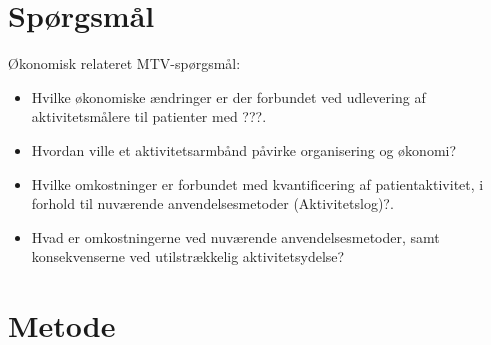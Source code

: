\documentclass[11pt,a4paper]{report}
\begin{document}

\section{Spørgsmål}



\noindent
Økonomisk relateret MTV-spørgsmål:  
\begin{itemize}
\item Hvilke økonomiske ændringer er der forbundet ved udlevering af aktivitetsmålere til patienter med ???.

\item Hvordan ville et aktivitetsarmbånd påvirke organisering og økonomi?

\item Hvilke omkostninger er forbundet med kvantificering af patientaktivitet, i forhold til nuværende anvendelsesmetoder (Aktivitetslog)?.  

\item Hvad er omkostningerne ved nuværende anvendelsesmetoder, samt konsekvenserne ved utilstrækkelig aktivitetsydelse? 
\end{itemize}

\section{Metode}
\end{document}
